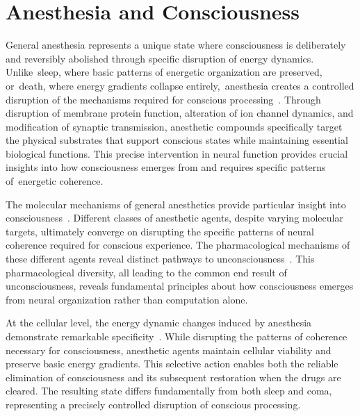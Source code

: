 \section{Anesthesia and Consciousness}

General anesthesia represents a unique state where consciousness is deliberately and reversibly abolished through specific disruption of energy dynamics. Unlike~sleep, where basic patterns of energetic organization are preserved, or~death, where energy gradients collapse entirely,~anesthesia creates a controlled disruption of the mechanisms required for conscious processing~\cite{pinotsis2023cytoelectric}. Through disruption of membrane protein function, alteration of ion channel dynamics, and modification of synaptic transmission, anesthetic compounds specifically target the physical substrates that support conscious states while maintaining essential biological functions. This precise intervention in neural function provides crucial insights into how consciousness emerges from and requires specific patterns of~energetic coherence.

The molecular mechanisms of general anesthetics provide particular insight into consciousness~\cite{kukushkin2024massed}. Different classes of anesthetic agents, despite varying molecular targets, ultimately converge on disrupting the specific patterns of neural coherence required for conscious experience. The pharmacological mechanisms of these different agents reveal distinct pathways to unconsciousness~\cite{amil2024theta}. This pharmacological diversity, all leading to the common end result of unconsciousness, reveals fundamental principles about how consciousness emerges from neural organization rather than computation alone.

At the cellular level, the energy dynamic changes induced by anesthesia demonstrate remarkable specificity~\cite{zheng2025unbearable}. While disrupting the patterns of coherence necessary for consciousness, anesthetic agents maintain cellular viability and preserve basic energy gradients. This selective action enables both the reliable elimination of consciousness and its subsequent restoration when the drugs are cleared. The resulting state differs fundamentally from both sleep and coma, representing a precisely controlled disruption of conscious processing.

